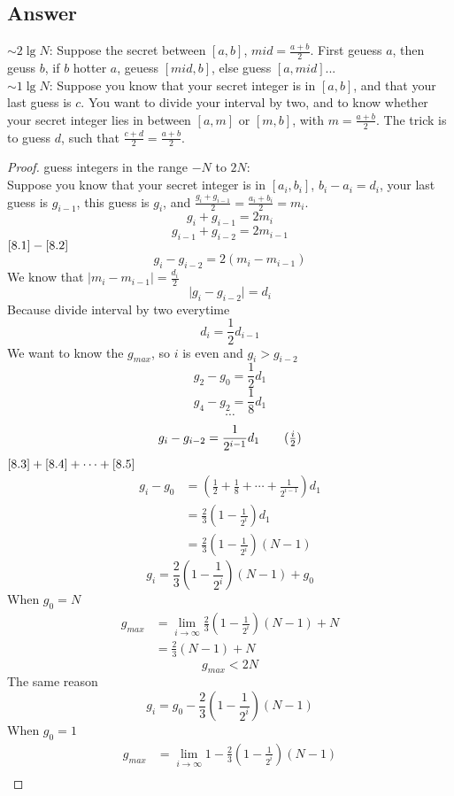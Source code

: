 \documentclass[12pt]{article}
\numberwithin{equation}{section}
\begin{document}
\subsection*{Answer}
$\sim$$2\lg{N}$: Suppose the secret between $[a, b]$, $mid=\frac{a+b}{2}$. First geuess $a$, then geuss $b$,
if $b$ hotter $a$, geuess $[mid, b]$, else guess $[a, mid]$...\\
$\sim$$1\lg{N}$: Suppose you know that your secret integer is in $[a,b]$, and that your last guess is $c$.
You want to divide your interval by two, and to know whether your secret integer lies in between $[a, m]$ or
$[m, b]$, with $m=\frac{a+b}{2}$. The trick is to guess $d$, such that $\frac{c+d}{2}=\frac{a+b}{2}$.
\begin{proof}
    guess integers in the range $-N$ to $2N$:\\
    Suppose you know that your secret integer is in $[a_i,b_i]$, $b_i-a_i=d_i$, your last guess
    is $g_{i-1}$, this guess is $g_i$, and $\frac{g_i+g_{i-1}}{2}=\frac{a_i+b_i}{2}=m_i$.
    \[g_i+g_{i-1}=2m_i \tag{1}\label{8.1}\]
    \[g_{i-1}+g_{i-2}=2m_{i-1} \tag{2}\label{8.2}\]
    $\eqref{8.1}-\eqref{8.2}$
    \[g_{i}-g_{i-2}=2(m_i-m_{i-1})\]
    We know that $\mid m_i-m_{i-1} \mid = \frac{d_i}{2}$
    \[\mid g_{i}-g_{i-2}\mid=d_i\]
    Because divide interval by two everytime
    \[d_i=\frac{1}{2}d_{i-1}\]
    We want to know the $g_{max}$, so $i$ is even and $g_i>g_{i-2}$
    \[g_2-g_0=\frac{1}{2}d_1 \tag{1}\label{8.3}\]
    \[g_4-g_2=\frac{1}{8}d_1 \tag{2}\label{8.4}\]
    \[\cdots\]
    \[g_i-g_{i-2}=\frac{1}{2^{i-1}}d_1 \tag{$\frac{i}{2}$}\label{8.5}\]
    $\eqref{8.3}+\eqref{8.4}+\cdots+\eqref{8.5}$
    \begin{align*}
    g_i-g_0&=(\frac{1}{2}+\frac{1}{8}+\cdots+\frac{1}{2^{i-1}})d_1\\
    &=\frac{2}{3}(1-\frac{1}{2^i})d_1\\
    &=\frac{2}{3}(1-\frac{1}{2^i})(N-1)
    \end{align*}
    \[g_i=\frac{2}{3}(1-\frac{1}{2^i})(N-1)+g_0\]
    When $g_0=N$
    \begin{align*}
    g_{max}&=\lim_{i\to\infty}\frac{2}{3}(1-\frac{1}{2^i})(N-1)+N\\
    &=\frac{2}{3}(N-1)+N
    \end{align*}
    \[g_{max}<2N\]
    The same reason
    \[g_i=g_0-\frac{2}{3}(1-\frac{1}{2^i})(N-1)\]
    When $g_0=1$
    \begin{align*}
    g_{max}&=\lim_{i\to\infty}1-\frac{2}{3}(1-\frac{1}{2^i})(N-1)\\

\end{align*}
\end{proof}
\end{document}
